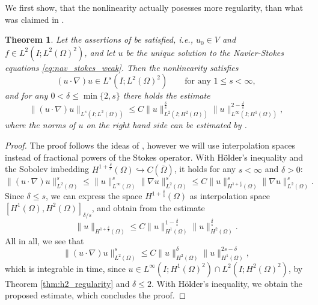 \documentclass{m2an}
\newcommand\blue[1]{\textcolor{black}{#1}}
\newtheorem{theorem}{Theorem}[section]
\newcommand{\LinfHone}{L^\infty(I;H^1(\Omega))}
\newcommand{\LtwoHtwo}{L^2(I;H^2(\Omega))}
\begin{document}
We first show, that the nonlinearity actually posesses more regularity, than what was claimed in 
.
\begin{theorem}\label{thm:nonlinearity_higher_regularity}
  Let the assertions of  be satisfied,
  i.e., $u_0 \in V$ and $f \in L^2(I;L^2(\Omega)^2)$, and let $u$ be the unique solution to the
  Navier-Stokes equations
  \eqref{eq:nav_stokes_weak}. Then the nonlinearity satisfies
  \begin{equation*}
    (u \cdot \nabla) u \in L^s(I;L^2(\Omega)^2) \qquad \text{for any } 1 \le s < \infty,
  \end{equation*}
  and for any $0 < \delta \le \min\{2,s\}$ there holds the estimate
  \begin{equation*}
    \|(u\cdot \nabla) u \|_{L^s(I;L^2(\Omega))} 
    \le C \|u\|_{\LtwoHtwo}^{ \frac{\delta}{s}} \|u\|_{\LinfHone}^{2 - \frac{\delta}{s} },
  \end{equation*}
  where the norms of $u$ on the right hand side can be estimated by .
\end{theorem}
\begin{proof}
  The proof follows the ideas of \cite[Theorem V.1.8.2]{Sohr2001}, however we will use  
  interpolation spaces instead of fractional powers of the Stokes operator.
  With \blue{Hölder's} inequality  and the Sobolev imbedding 
  $H^{1+ \frac{\delta}{s}}(\Omega) \hookrightarrow C(\overline{\Omega})$,
  it holds for any $s < \infty$ and $\delta > 0$:
  \begin{equation*}
    \|(u\cdot \nabla)u\|_{L^2(\Omega)}^s 
    \le \|u\|_{L^\infty(\Omega)}^s \|\nabla u\|_{L^2(\Omega)}^s
    \le C\|u\|_{H^{1 + \frac{\delta}{s}}(\Omega)}^s \|\nabla u\|_{L^2(\Omega)}^s.
  \end{equation*}
  Since $\delta \le s$, we can express the space $H^{1+ \frac{\delta}{s}}(\Omega)$ as interpolation space
  $[H^1(\Omega),H^2(\Omega)]_{\delta/s}$, and
  obtain from \cite[Theorem 1]{Brezis2018} the estimate
  \begin{equation*}
    \|u\|_{H^{1 + \frac{\delta}{s}}(\Omega)} \le 
    C \|u\|_{H^{1}(\Omega)}^{1- \frac{\delta}{s}} 
    \|u\|_{H^{2}(\Omega)}^{ \frac{\delta}{s}}.
  \end{equation*}
  All in all, we see that
  \begin{equation*}
    \|(u\cdot \nabla)u\|_{L^2(\Omega)}^s \le C \|u\|_{H^2(\Omega)}^\delta \|u\|_{H^1(\Omega)}^{2s - \delta},
  \end{equation*}
  which is integrable in time, since $u \in L^\infty(I;H^1(\Omega)^2) \cap L^2(I;H^2(\Omega)^2)$,
  by Theorem \ref{thm:h2_regularity} and $\delta \le 2$. 
  With \blue{Hölder's} inequality, we obtain the proposed estimate, which concludes the proof.
\end{proof}
\end{document}
